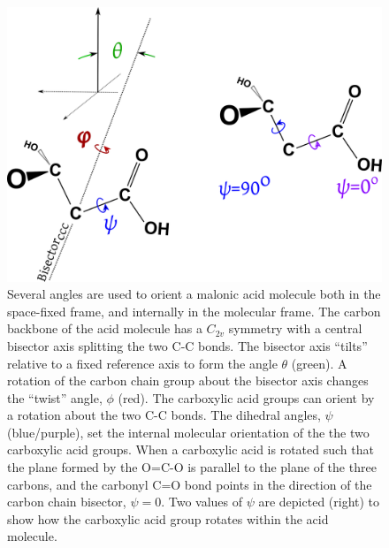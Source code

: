 \begin{figure}[h!]
	\begin{center}
		\includegraphics[scale=1.0]{images/malonic-angles/malonic-angles.png}
		\caption{Several angles are used to orient a malonic acid molecule both in the space-fixed frame, and internally in the molecular frame. The carbon backbone of the acid molecule has a $C_{2v}$ symmetry with a central bisector axis splitting the two C-C bonds. The bisector axis ``tilts'' relative to a fixed reference axis to form the angle $\theta$ (green). A rotation of the carbon chain group about the bisector axis changes the ``twist'' angle, $\phi$ (red). The carboxylic acid groups can orient by a rotation about the two C-C bonds. The dihedral angles, $\psi$ (blue/purple), set the internal molecular orientation of the the two carboxylic acid groups. When a carboxylic acid is rotated such that the plane formed by the O=C-O is parallel to the plane of the three carbons, and the carbonyl C=O bond points in the direction of the carbon chain bisector, $\psi=0$\textdegree. Two values of $\psi$ are depicted (right) to show how the carboxylic acid group rotates within the acid molecule.}
		\label{fig:angle-definitions}
	\end{center}
\end{figure}

